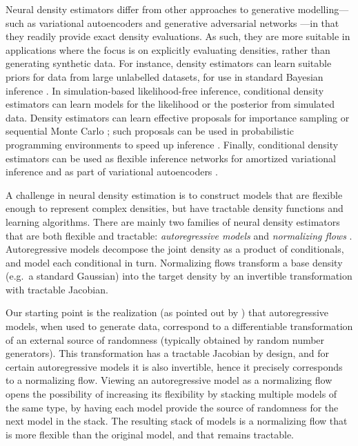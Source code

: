 Neural density estimators differ from other approaches to generative modelling---such as variational autoencoders \citep{Kingma:2014, Rezende:2014} and generative adversarial networks \citep{Goodfellow:2014}---in that they readily provide exact density evaluations. As such, they are more suitable in applications where the focus is on explicitly evaluating densities, rather than generating synthetic data. For instance, density estimators can learn suitable priors for data from large unlabelled datasets, for use in standard Bayesian inference \citep{Zoran:2011}. In simulation-based likelihood-free inference, conditional density estimators can learn models for the likelihood \citep{Fan:2013} or the posterior \cite{Papamakarios:2016} from simulated data. Density estimators can learn effective proposals for importance sampling \citep{Papamakarios:2015} or sequential Monte Carlo \citep{Gu:2015, Paige:2016}; such proposals can be used in probabilistic programming environments to speed up inference \citep{Kulkarni:2015, Le:2017}. Finally, conditional density estimators can be used as flexible inference networks for amortized variational inference and as part of variational autoencoders \citep{Kingma:2014, Rezende:2014}.

A challenge in neural density estimation is to construct models that are flexible enough to represent complex densities, but have tractable density functions and learning algorithms. There are mainly two families of neural density estimators that are both flexible and tractable: \emph{autoregressive models} \citep{Uria:2017} and \emph{normalizing flows} \citep{Rezende:2015}. Autoregressive models decompose the joint density as a product of conditionals, and model each conditional in turn. Normalizing flows transform a base density (e.g.~a standard Gaussian) into the target density by an invertible transformation with tractable Jacobian. 

Our starting point is the realization (as pointed out by \citet{Kingma:2016}) that autoregressive models, when used to generate data, correspond to a differentiable transformation of an external source of randomness (typically obtained by random number generators). This transformation has a tractable Jacobian by design, and for certain autoregressive models it is also invertible, hence it precisely corresponds to a normalizing flow. Viewing an autoregressive model as a normalizing flow opens the possibility of increasing its flexibility by stacking multiple models of the same type, by having each model provide the source of randomness for the next model in the stack. The resulting stack of models is a normalizing flow that is more flexible than the original model, and that remains tractable.

